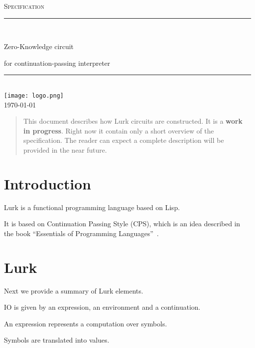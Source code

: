 \documentclass[10pt, english]{article}
\begin{document}
\begin{titlepage}
	\newcommand{\HRule}{\rule{\linewidth}{0.5mm}}

	\clearpage\thispagestyle{empty}
	\centering
	\vspace{1cm}

	\textsc{\Large Specification}\\[.5cm]
	\HRule\\[.5cm]
	{\Huge Zero-Knowledge circuit \par}
	\vspace{.5cm}
	{\Large for continuation-passing interpreter \par}
	\vspace{.5cm}
	\HRule \\[.5cm]


\texttt{[image: logo.png]}\\[.1cm]
	{\large \today}\\[2cm]
\vfill
\end{titlepage}


\begin{abstract}
  This document describes how Lurk circuits are constructed. It is a \textbf{work in progress}.
  Right now it contain only a short overview of the specification. The reader can expect a complete description will be provided in the near future.
\end{abstract}

\tableofcontents

\newpage

\section{Introduction}

Lurk is a functional programming language based on Lisp.

It is based on Continuation Passing Style (CPS), which is an idea described in the book ``Essentials of Programming Languages''~\cite{FWbook}.

\section{Lurk}

Next we provide a summary of Lurk elements.

IO is given by an expression, an environment and a continuation.

An expression represents a computation over symbols.

Symbols are translated into values.
\end{document}
